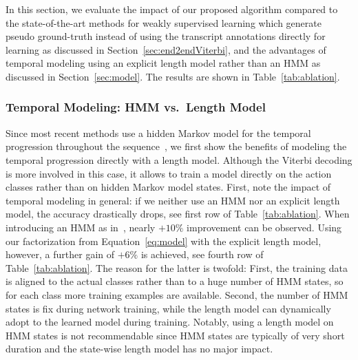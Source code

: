 \documentclass[10pt,twocolumn,letterpaper]{article}
\begin{document}
In this section, we evaluate the impact of our proposed algorithm compared
to the state-of-the-art methods for weakly supervised learning which generate pseudo ground-truth instead of using the transcript annotations directly for learning as discussed in Section~\ref{sec:end2endViterbi}, and the advantages of temporal modeling
using an explicit length model rather than an HMM as discussed in Section~\ref{sec:model}.
The results are shown in Table~\ref{tab:ablation}.

\subsubsection{Temporal Modeling: HMM vs.\ Length Model}
Since most recent methods use a hidden Markov model for the temporal progression throughout
the sequence~\cite{kuehne2017weakly,richard2017weakly,koller2017resign}, we first show the
benefits of modeling the temporal progression directly with a length model. Although the
Viterbi decoding is more involved in this case, it allows to train a model directly on the
action classes rather than on hidden Markov model states.
First, note the impact of temporal modeling in general: if we neither use an HMM nor
an explicit length model, the accuracy drastically drops, see first row of Table~\ref{tab:ablation}.
When introducing an HMM as in~\cite{richard2017weakly}, nearly $ +10\% $ improvement can be
observed. Using our factorization from Equation~\eqref{eq:model} with the explicit length
model, however, a further gain of $ +6\% $ is achieved, see fourth row of Table~\ref{tab:ablation}.
The reason for the latter is twofold: First, the training data is aligned to the actual classes
rather than to a huge number of HMM states, so for each class more training examples are available.
Second, the number of HMM states is fix during network training, while the length model can
dynamically adopt to the learned model during training. Notably, using a length model on
HMM states is not recommendable since HMM states are typically of very short duration and the
state-wise length model has no major impact.
\end{document}
